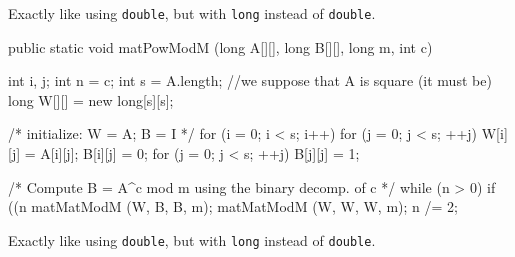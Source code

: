 \begin{tabb} Exactly like  using \texttt{double}, but with \texttt{long} instead of
  \texttt{double}.
\end{tabb}
\begin{htmlonly}
\end{htmlonly}
\begin{code}

   public static void matPowModM (long A[][], long B[][], long m, int c) \begin{hide} {
      int i, j;
      int n = c;
      int s = A.length;   //we suppose that A is square (it must be)
      long W[][] = new long[s][s];

      /* initialize: W = A; B = I */
      for (i = 0; i < s; i++) {
         for (j = 0; j < s;  ++j)  {
            W[i][j] = A[i][j];
            B[i][j] = 0;
         }
      }
      for (j = 0; j < s;  ++j)
         B[j][j] = 1;

      /* Compute B = A^c mod m using the binary decomp. of c */
      while (n > 0) {
         if ((n %
            matMatModM (W, B, B, m);
         matMatModM (W, W, W, m);
         n /= 2;
      }
   } \end{hide}
\end{code}
\begin{tabb} Exactly like  using \texttt{double}, but with \texttt{long} instead
  of \texttt{double}.
\end{tabb}
\begin{htmlonly}
\end{htmlonly}
\begin{code}
\begin{hide}
}
\end{hide}
\end{code}


